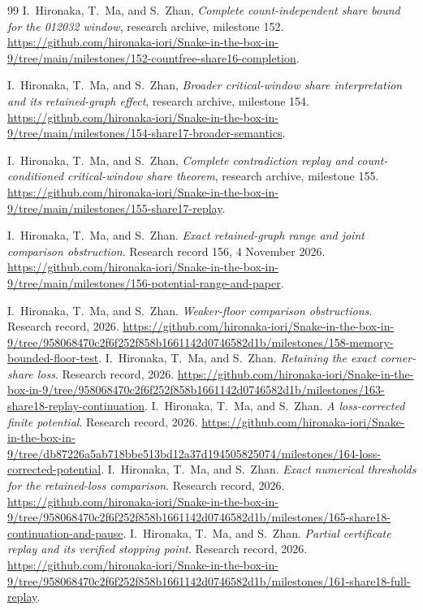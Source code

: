 \documentclass[11pt,a4paper]{article}
\theoremstyle{definition}
\theoremstyle{remark}
\begin{document}
\begin{thebibliography}{99}
I.~Hironaka, T.~Ma, and S.~Zhan, \emph{Complete count-independent share
bound for the 012032 window}, research archive, milestone 152.
\url{https://github.com/hironaka-iori/Snake-in-the-box-in-9/tree/main/milestones/152-countfree-share16-completion}.

I.~Hironaka, T.~Ma, and S.~Zhan, \emph{Broader critical-window share
interpretation and its retained-graph effect}, research archive, milestone 154.
\url{https://github.com/hironaka-iori/Snake-in-the-box-in-9/tree/main/milestones/154-share17-broader-semantics}.

I.~Hironaka, T.~Ma, and S.~Zhan, \emph{Complete contradiction replay and
count-conditioned critical-window share theorem}, research archive,
milestone 155.
\url{https://github.com/hironaka-iori/Snake-in-the-box-in-9/tree/main/milestones/155-share17-replay}.

I.~Hironaka, T.~Ma, and S.~Zhan. \emph{Exact retained-graph range and
joint comparison obstruction}. Research record 156, 4 November 2026.
\url{https://github.com/hironaka-iori/Snake-in-the-box-in-9/tree/main/milestones/156-potential-range-and-paper}.


I.~Hironaka, T.~Ma, and S.~Zhan. \emph{Weaker-floor comparison obstructions}. Research record, 2026.
\url{https://github.com/hironaka-iori/Snake-in-the-box-in-9/tree/958068470c2f6f252f858b1661142d0746582d1b/milestones/158-memory-bounded-floor-test}.
I.~Hironaka, T.~Ma, and S.~Zhan. \emph{Retaining the exact corner-share loss}. Research record, 2026.
\url{https://github.com/hironaka-iori/Snake-in-the-box-in-9/tree/958068470c2f6f252f858b1661142d0746582d1b/milestones/163-share18-replay-continuation}.
I.~Hironaka, T.~Ma, and S.~Zhan. \emph{A loss-corrected finite potential}. Research record, 2026.
\url{https://github.com/hironaka-iori/Snake-in-the-box-in-9/tree/db87226a5ab718bbe513bd12a37d194505825074/milestones/164-loss-corrected-potential}.
I.~Hironaka, T.~Ma, and S.~Zhan. \emph{Exact numerical thresholds for the retained-loss comparison}. Research record, 2026.
\url{https://github.com/hironaka-iori/Snake-in-the-box-in-9/tree/958068470c2f6f252f858b1661142d0746582d1b/milestones/165-share18-continuation-and-pause}.
I.~Hironaka, T.~Ma, and S.~Zhan. \emph{Partial certificate replay and its verified stopping point}. Research record, 2026.
\url{https://github.com/hironaka-iori/Snake-in-the-box-in-9/tree/958068470c2f6f252f858b1661142d0746582d1b/milestones/161-share18-full-replay}.


\end{thebibliography}
\end{document}
